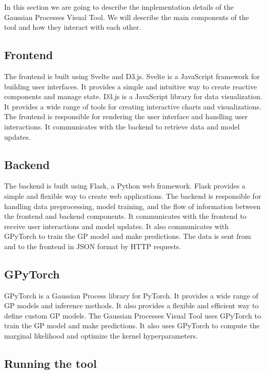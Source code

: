 \documentclass[preprint,journal]{vgtc}       %
\begin{document}
In this section we are going to describe the implementation details of the Gaussian Processes Visual Tool. We will describe the main components of the tool and how they interact with each other.

\subsection{Frontend}

The frontend is built using Svelte and D3.js. Svelte is a JavaScript framework for building user interfaces. It provides a simple and intuitive way to create reactive components and manage state. D3.js is a JavaScript library for data visualization. It provides a wide range of tools for creating interactive charts and visualizations. The frontend is responsible for rendering the user interface and handling user interactions. It communicates with the backend to retrieve data and model updates.

\subsection{Backend}

The backend is built using Flask, a Python web framework. Flask provides a simple and flexible way to create web applications. The backend is responsible for handling data preprocessing, model training, and the flow of information between the frontend and backend components. It communicates with the frontend to receive user interactions and model updates. It also communicates with GPyTorch to train the GP model and make predictions. The data is sent from and to the frontend in JSON format by HTTP requests.

\subsection{GPyTorch}

GPyTorch is a Gaussian Process library for PyTorch. It provides a wide range of GP models and inference methods. It also provides a flexible and efficient way to define custom GP models. The Gaussian Processes Visual Tool uses GPyTorch to train the GP model and make predictions. It also uses GPyTorch to compute the marginal likelihood and optimize the kernel hyperparameters.

\subsection{Running the tool}
\end{document}
